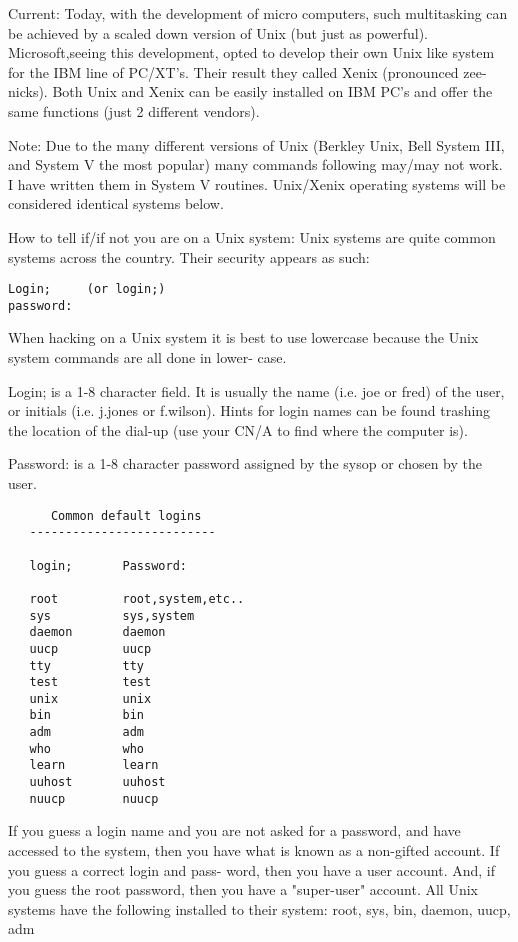 \documentclass[a1paper]{article}
\begin{document}
\begin{multicols}{7}
{  Current:  Today, with the development of micro computers, such multitasking
can be achieved by a scaled down version of Unix (but just as powerful).
Microsoft,seeing this development, opted to develop their own Unix like system
for the IBM line of PC/XT's.  Their result they called Xenix (pronounced
zee-nicks).  Both Unix and Xenix can be easily installed on IBM PC's and offer
the same functions (just 2 different vendors).

  Note:  Due to the many different versions of Unix (Berkley Unix, Bell System
III, and System V the most popular) many commands following may/may not work.  I
have written them in System V routines.  Unix/Xenix operating systems will be
considered identical systems below.

  How to tell if/if not you are on a Unix system:  Unix systems are quite common
systems across the country.  Their security appears as such:

\begin{verbatim}
Login;     (or login;)
password:
\end{verbatim}

  When hacking on a Unix system it is best to use lowercase because the Unix
system commands are all done in lower- case.

  Login; is a 1-8 character field.  It is usually the name (i.e.  joe or fred)
of the user, or initials (i.e.  j.jones or f.wilson).  Hints for login names can
be found trashing the location of the dial-up (use your CN/A to find where the
computer is).

  Password:  is a 1-8 character password assigned by the sysop or chosen by the
user.

\begin{verbatim}
      Common default logins
   --------------------------

   login;       Password:

   root         root,system,etc..
   sys          sys,system
   daemon       daemon
   uucp         uucp
   tty          tty
   test         test
   unix         unix
   bin          bin
   adm          adm
   who          who
   learn        learn
   uuhost       uuhost
   nuucp        nuucp
\end{verbatim}

  If you guess a login name and you are not asked for a password, and have
accessed to the system, then you have what is known as a non-gifted account.  If
you guess a correct login and pass- word, then you have a user account.  And,
if you guess the root password, then you have a "super-user" account.  All Unix
systems have the following installed to their system:  root, sys, bin, daemon,
uucp, adm

}
\end{multicols}
\end{document}
